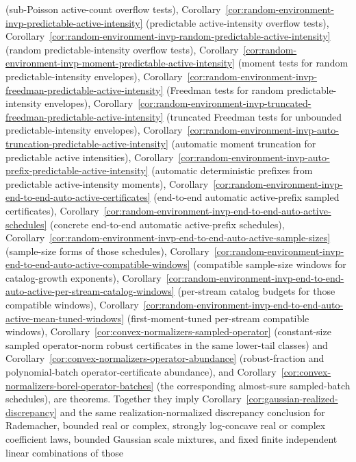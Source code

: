 \documentclass[11pt]{amsart}
\numberwithin{equation}{section}
\theoremstyle{definition}
\theoremstyle{remark}
\begin{document}
(sub-Poisson active-count overflow tests),
Corollary~\ref{cor:random-environment-invp-predictable-active-intensity}
(predictable active-intensity overflow tests),
Corollary~\ref{cor:random-environment-invp-random-predictable-active-intensity}
(random predictable-intensity overflow tests),
Corollary~\ref{cor:random-environment-invp-moment-predictable-active-intensity}
(moment tests for random predictable-intensity envelopes),
Corollary~\ref{cor:random-environment-invp-freedman-predictable-active-intensity}
(Freedman tests for random predictable-intensity envelopes),
Corollary~\ref{cor:random-environment-invp-truncated-freedman-predictable-active-intensity}
(truncated Freedman tests for unbounded predictable-intensity envelopes),
Corollary~\ref{cor:random-environment-invp-auto-truncation-predictable-active-intensity}
(automatic moment truncation for predictable active intensities),
Corollary~\ref{cor:random-environment-invp-auto-prefix-predictable-active-intensity}
(automatic deterministic prefixes from predictable active-intensity moments),
Corollary~\ref{cor:random-environment-invp-end-to-end-auto-active-certificates}
(end-to-end automatic active-prefix sampled certificates),
Corollary~\ref{cor:random-environment-invp-end-to-end-auto-active-schedules}
(concrete end-to-end automatic active-prefix schedules),
Corollary~\ref{cor:random-environment-invp-end-to-end-auto-active-sample-sizes}
(sample-size forms of those schedules),
Corollary~\ref{cor:random-environment-invp-end-to-end-auto-active-compatible-windows}
(compatible sample-size windows for catalog-growth exponents),
Corollary~\ref{cor:random-environment-invp-end-to-end-auto-active-per-stream-catalog-windows}
(per-stream catalog budgets for those compatible windows),
Corollary~\ref{cor:random-environment-invp-end-to-end-auto-active-mean-tuned-windows}
(first-moment-tuned per-stream compatible windows),
Corollary~\ref{cor:convex-normalizers-sampled-operator} (constant-size sampled
operator-norm robust certificates in the same lower-tail classes) and
Corollary~\ref{cor:convex-normalizers-operator-abundance} (robust-fraction and
polynomial-batch operator-certificate abundance), and
Corollary~\ref{cor:convex-normalizers-borel-operator-batches} (the corresponding
almost-sure sampled-batch schedules), are
theorems.  Together they imply
Corollary~\ref{cor:gaussian-realized-discrepancy} and the same
realization-normalized discrepancy conclusion for Rademacher, bounded real or
complex, strongly log-concave real or complex coefficient laws, bounded Gaussian
scale mixtures, and fixed finite independent linear combinations of those
\end{document}
